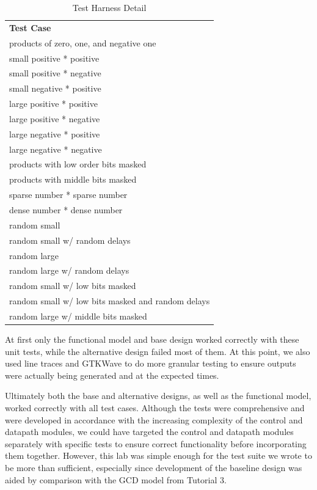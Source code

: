 \documentclass[11pt]{article}
\begin{document}
\begin{table}[h]
\begin{tabular}{l}
\textbf{Test Case}                                \\
products of zero, one, and negative one           \\
small positive * positive                         \\
small positive * negative                         \\
small negative * positive                         \\
large positive * positive                         \\
large positive * negative                         \\
large negative * positive                         \\
large negative * negative                         \\
products with low order bits masked               \\
products with middle bits masked                  \\
sparse number * sparse number                     \\
dense number * dense number                       \\
random small                                      \\
random small w/ random delays                     \\
random large                                      \\
random large w/ random delays                     \\
random small w/ low bits masked                   \\
random small w/ low bits masked and random delays \\
random large w/ middle bits masked                \\
                                                 
\end{tabular}
\caption{Test Harness Detail}
\end{table}


At first only the functional model and base design worked correctly with these unit tests, while the alternative design failed most of them. At this point, we also used line traces and GTKWave to do more granular testing to ensure outputs were actually being generated and at the expected times. 

Ultimately both the base and alternative designs, as well as the functional model, worked correctly with all test cases. Although the tests were comprehensive and were developed in accordance with the increasing complexity of the control and datapath modules, we could have targeted the control and datapath modules separately with specific tests to ensure correct functionality before incorporating them together. However, this lab was simple enough for the test suite we wrote to be more than sufficient, especially since development of the baseline design was aided by comparison with the GCD model from Tutorial 3. 
\end{document}
